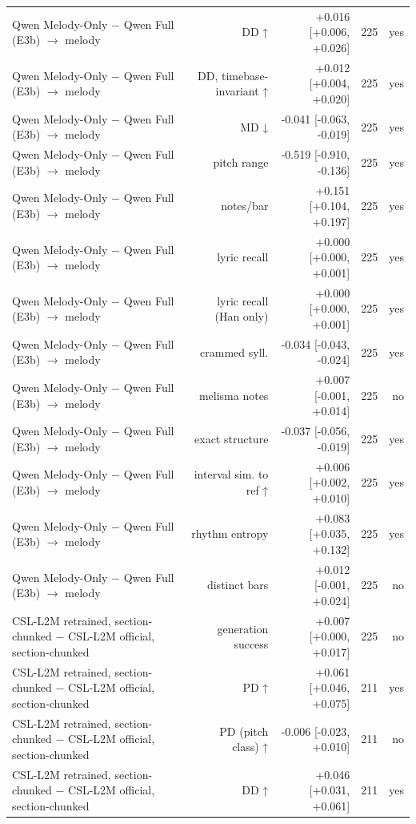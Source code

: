 \begin{table}[t]
\begin{tabular}{lrrrr}
Qwen Melody-Only $-$ Qwen Full (E3b) $\rightarrow$ melody & DD ↑ & +0.016 [+0.006, +0.026] & 225 & yes \\
Qwen Melody-Only $-$ Qwen Full (E3b) $\rightarrow$ melody & DD, timebase-invariant ↑ & +0.012 [+0.004, +0.020] & 225 & yes \\
Qwen Melody-Only $-$ Qwen Full (E3b) $\rightarrow$ melody & MD ↓ & -0.041 [-0.063, -0.019] & 225 & yes \\
Qwen Melody-Only $-$ Qwen Full (E3b) $\rightarrow$ melody & pitch range & -0.519 [-0.910, -0.136] & 225 & yes \\
Qwen Melody-Only $-$ Qwen Full (E3b) $\rightarrow$ melody & notes/bar & +0.151 [+0.104, +0.197] & 225 & yes \\
Qwen Melody-Only $-$ Qwen Full (E3b) $\rightarrow$ melody & lyric recall & +0.000 [+0.000, +0.001] & 225 & yes \\
Qwen Melody-Only $-$ Qwen Full (E3b) $\rightarrow$ melody & lyric recall (Han only) & +0.000 [+0.000, +0.001] & 225 & yes \\
Qwen Melody-Only $-$ Qwen Full (E3b) $\rightarrow$ melody & crammed syll. & -0.034 [-0.043, -0.024] & 225 & yes \\
Qwen Melody-Only $-$ Qwen Full (E3b) $\rightarrow$ melody & melisma notes & +0.007 [-0.001, +0.014] & 225 & no \\
Qwen Melody-Only $-$ Qwen Full (E3b) $\rightarrow$ melody & exact structure & -0.037 [-0.056, -0.019] & 225 & yes \\
Qwen Melody-Only $-$ Qwen Full (E3b) $\rightarrow$ melody & interval sim. to ref ↑ & +0.006 [+0.002, +0.010] & 225 & yes \\
Qwen Melody-Only $-$ Qwen Full (E3b) $\rightarrow$ melody & rhythm entropy & +0.083 [+0.035, +0.132] & 225 & yes \\
Qwen Melody-Only $-$ Qwen Full (E3b) $\rightarrow$ melody & distinct bars & +0.012 [-0.001, +0.024] & 225 & no \\
CSL-L2M retrained, section-chunked $-$ CSL-L2M official, section-chunked & generation success & +0.007 [+0.000, +0.017] & 225 & no \\
CSL-L2M retrained, section-chunked $-$ CSL-L2M official, section-chunked & PD ↑ & +0.061 [+0.046, +0.075] & 211 & yes \\
CSL-L2M retrained, section-chunked $-$ CSL-L2M official, section-chunked & PD (pitch class) ↑ & -0.006 [-0.023, +0.010] & 211 & no \\
CSL-L2M retrained, section-chunked $-$ CSL-L2M official, section-chunked & DD ↑ & +0.046 [+0.031, +0.061] & 211 & yes \\

\end{tabular}
\end{table}
